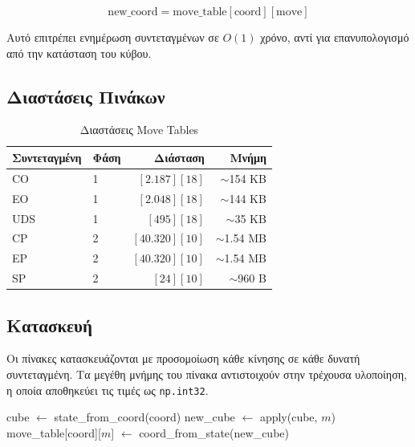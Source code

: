 \begin{equation}
    \text{new\_coord} = \text{move\_table}[\text{coord}][\text{move}]
\end{equation}

Αυτό επιτρέπει ενημέρωση συντεταγμένων σε $O(1)$ χρόνο, αντί για επανυπολογισμό από την κατάσταση του κύβου.

\subsection{Διαστάσεις Πινάκων}

\begin{table}[h]
\centering
\caption{Διαστάσεις Move Tables}
\label{tab:move_tables}
\begin{tabular}{llrr}
\toprule
\textbf{Συντεταγμένη} & \textbf{Φάση} & \textbf{Διάσταση} & \textbf{Μνήμη} \\
\midrule
CO & 1 & $[2.187][18]$ & $\sim$154 KB \\
EO & 1 & $[2.048][18]$ & $\sim$144 KB \\
UDS & 1 & $[495][18]$ & $\sim$35 KB \\
\midrule
CP & 2 & $[40.320][10]$ & $\sim$1.54 MB \\
EP & 2 & $[40.320][10]$ & $\sim$1.54 MB \\
SP & 2 & $[24][10]$ & $\sim$960 B \\
\bottomrule
\end{tabular}
\end{table}

\subsection{Κατασκευή}

Οι πίνακες κατασκευάζονται με προσομοίωση κάθε κίνησης σε κάθε δυνατή
συντεταγμένη. Τα μεγέθη μνήμης του πίνακα αντιστοιχούν στην τρέχουσα υλοποίηση,
η οποία αποθηκεύει τις τιμές ως \texttt{np.int32}.

\begin{algorithm}[H]
\caption{Κατασκευή Move Table}
\begin{algorithmic}[1]
    \State cube $\gets$ state\_from\_coord(coord)
        \State new\_cube $\gets$ apply(cube, $m$)
        \State move\_table[coord][$m$] $\gets$ coord\_from\_state(new\_cube)
    \EndFor
\EndFor
\end{algorithmic}
\end{algorithm}


